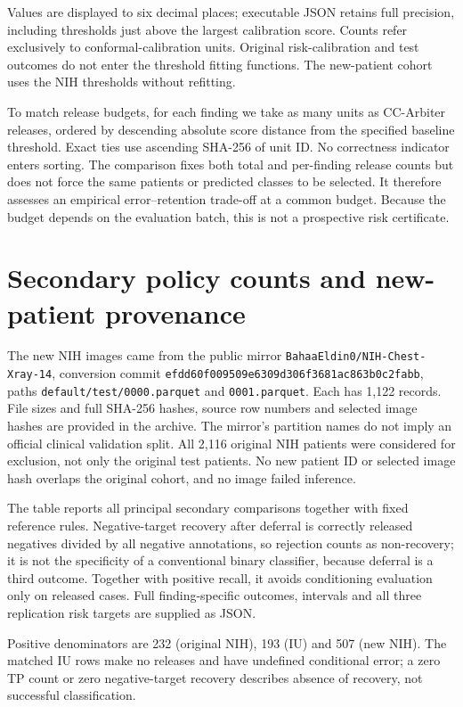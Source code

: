 \documentclass[10pt,a4paper]{article}
\begin{document}

\noindent Values are displayed to six decimal places; executable JSON retains full precision, including thresholds just above the largest calibration score. Counts refer exclusively to conformal-calibration units. Original risk-calibration and test outcomes do not enter the threshold fitting functions. The new-patient cohort uses the NIH thresholds without refitting.

To match release budgets, for each finding we take as many units as CC-Arbiter releases, ordered by descending absolute score distance from the specified baseline threshold. Exact ties use ascending SHA-256 of unit ID. No correctness indicator enters sorting. The comparison fixes both total and per-finding release counts but does not force the same patients or predicted classes to be selected. It therefore assesses an empirical error--retention trade-off at a common budget. Because the budget depends on the evaluation batch, this is not a prospective risk certificate.

\clearpage
\section{Secondary policy counts and new-patient provenance}
The new NIH images came from the public mirror \texttt{BahaaEldin0/NIH-Chest-Xray-14}, conversion commit \texttt{efdd60f009509e6309d306f3681ac863b0c2fabb}, paths \texttt{default/test/0000.parquet} and \texttt{0001.parquet}. Each has 1,122 records. File sizes and full SHA-256 hashes, source row numbers and selected image hashes are provided in the archive. The mirror's partition names do not imply an official clinical validation split. All 2,116 original NIH patients were considered for exclusion, not only the original test patients. No new patient ID or selected image hash overlaps the original cohort, and no image failed inference.

The table reports all principal secondary comparisons together with fixed reference rules. Negative-target recovery after deferral is correctly released negatives divided by all negative annotations, so rejection counts as non-recovery; it is not the specificity of a conventional binary classifier, because deferral is a third outcome. Together with positive recall, it avoids conditioning evaluation only on released cases. Full finding-specific outcomes, intervals and all three replication risk targets are supplied as JSON.

\noindent Positive denominators are 232 (original NIH), 193 (IU) and 507 (new NIH). The matched IU rows make no releases and have undefined conditional error; a zero TP count or zero negative-target recovery describes absence of recovery, not successful classification.
\end{document}
